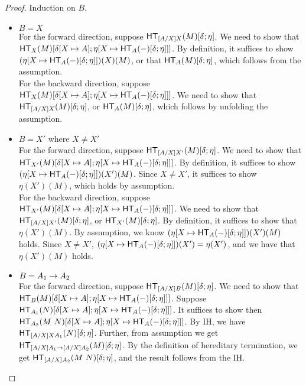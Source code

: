 \documentclass{article}
\begin{document}
\begin{proof}
Induction on $B$.
\begin{itemize}
\setlength\itemsep{1em}
\item $B = X$\\
For the forward direction, suppose $\mathsf{HT}_{[A/X]X}(M)[\delta;\eta]$. We need to show that
$\mathsf{HT}_{X}(M)[\delta[X \mapsto A];\eta[X \mapsto \mathsf{HT}_{A}(-)[\delta;\eta]]]$. By definition, it suffices to show
$(\eta[X \mapsto \mathsf{HT}_{A}(-)[\delta;\eta]])(X)(M)$, or that $\mathsf{HT}_{A}(M)[\delta;\eta]$, which follows from the
assumption.\\

For the backward direction, suppose $\mathsf{HT}_{X}(M)[\delta[X \mapsto A];\eta[X \mapsto \mathsf{HT}_{A}(-)[\delta;\eta]]]$.
We need to show that $\mathsf{HT}_{[A/X]X}(M)[\delta;\eta]$, or $\mathsf{HT}_{A}(M)[\delta;\eta]$, which follows by unfolding
the assumption.

\item $B = X'$ where $X \ne X'$\\
For the forward direction, suppose $\mathsf{HT}_{[A/X]X'}(M)[\delta;\eta]$. We need to show that
$\mathsf{HT}_{X'}(M)[\delta[X \mapsto A];\eta[X \mapsto \mathsf{HT}_{A}(-)[\delta;\eta]]]$. By definition, it suffices to show
$(\eta[X \mapsto \mathsf{HT}_{A}(-)[\delta;\eta]])(X')(M)$. Since $ X \ne X'$,
it suffices to show $\eta(X')(M)$, which holds by assumption. \\

For the backward direction, suppose $\mathsf{HT}_{X'}(M)[\delta[X \mapsto A];\eta[X \mapsto \mathsf{HT}_{A}(-)[\delta;\eta]]]$.
We need to show that $\mathsf{HT}_{[A/X]X'}(M)[\delta;\eta]$, or $\mathsf{HT}_{X'}(M)[\delta;\eta]$. By definition, it suffices
to show that $\eta(X')(M)$. By assumption, we know $(\eta[X \mapsto \mathsf{HT}_{A}(-)[\delta;\eta]])(X')(M)$ holds. Since
$X \ne X'$, $(\eta[X \mapsto \mathsf{HT}_{A}(-)[\delta;\eta]])(X') = \eta(X')$, and we have that $\eta(X')(M)$ holds.

\item $B = A_1 \to A_2$\\
For the forward direction, suppose $\mathsf{HT}_{[A/X]B}(M)[\delta;\eta]$. We need to show that
$\mathsf{HT}_{B}(M)[\delta[X \mapsto A];\eta[X \mapsto \mathsf{HT}_{A}(-)[\delta;\eta]]]$.
Suppose $\mathsf{HT}_{A_1}(N)[\delta[X \mapsto A];\eta[X \mapsto \mathsf{HT}_{A}(-)[\delta;\eta]]]$. It suffices to show
then $\mathsf{HT}_{A_2}(M\ N)[\delta[X \mapsto A];\eta[X \mapsto \mathsf{HT}_{A}(-)[\delta;\eta]]]$.
By IH, we have $\mathsf{HT}_{[A/X]XA_1}(N)[\delta;\eta]$. Further, from assumption we get
$\mathsf{HT}_{[A/X]A_1 \to [A/X]A_2}(M)[\delta;\eta]$. By the definition of hereditary termination, we get
$\mathsf{HT}_{[A/X]A_2}(M\ N)[\delta;\eta]$, and the result follows from the IH.


\end{itemize}
\end{proof}
\end{document}

